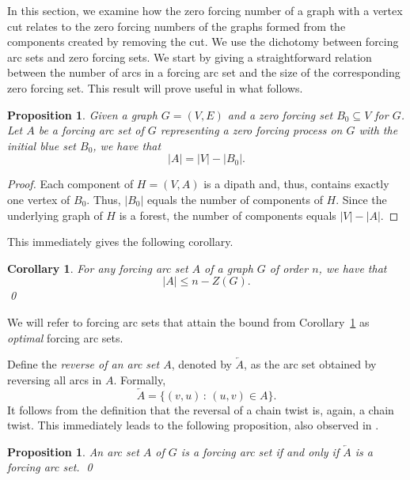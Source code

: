 \documentclass[12pt]{amsart}
\theoremstyle{plain}
\newtheorem{proposition}[theorem]{Proposition}
\newtheorem{corollary}[theorem]{Corollary}
\theoremstyle{definition}
\renewcommand{\subset}{\subseteq}
\begin{document}
In this section, we examine how the zero forcing number of a graph with a vertex cut relates to the zero forcing numbers of the graphs formed from the components created by removing the cut. We use the dichotomy between forcing arc sets and zero forcing sets. We start by giving a straightforward relation between the number of arcs in a forcing arc set and the size of the corresponding zero forcing set. This result will prove useful in what follows. 

\begin{proposition}\label{prop:sizeBA}
Given a graph $G=(V,E)$ and a zero forcing set $B_0\subset V$ for $G$. Let $A$ be a forcing arc set of $G$ representing a zero forcing process on $G$ with the initial blue set $B_0$, we have that 
\begin{equation*}
|A|=|V|-|B_0|.
\end{equation*}
\end{proposition}
\begin{proof}
Each component of $H = (V, A)$ is a dipath and, thus, contains exactly one vertex of $B_0$. Thus, $|B_0|$ equals the number of components of $H$. Since the underlying graph of $H$ is a forest, the number of components equals $|V|-|A|$.
\end{proof}


This immediately gives the following corollary. 
\begin{corollary}\label{cor:sizeBA}
    For any forcing arc set $A$ of a graph $G$ of order $n$, we have that 
    \[
    |A|\leq n-Z(G).
    \]\hfill\qed
\end{corollary}
We will refer to forcing arc sets that attain the bound from Corollary~\ref{cor:sizeBA} as \emph{optimal} forcing arc sets. 

Define the {\em reverse of an arc set $A$}, denoted by $\overleftarrow{A}$, as the arc set obtained by reversing all arcs in $A$. Formally, 
\begin{equation*}
    \overleftarrow{A}=\{ (v,u)\,:\,(u,v)\in A\}.
\end{equation*}
It follows from the definition that the reversal of a chain twist is, again, a chain twist. This immediately leads to the following proposition, also observed in \cite{hogben2012propagation}.  

\begin{proposition}\label{prop:reverse}
    An arc set $A$ of $G$ is a forcing arc set if and only if $\overleftarrow{A}$ is a forcing arc set. 
    \hfill \qed
\end{proposition}
\end{document}
